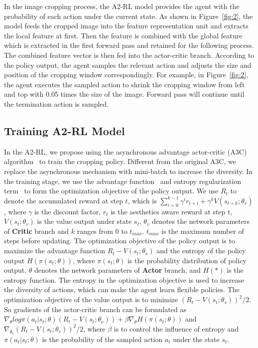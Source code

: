 \documentclass[10pt,twocolumn,letterpaper]{article}
\begin{document}
In the image cropping process, the A2-RL model provides the agent with the probability of each action under the current state. As shown in Figure~\ref{fig:2}, the model feeds the cropped image into the feature representation unit and extracts the local feature at first. Then the feature is combined with the global feature which is extracted in the first forward pass and retained for the following process. The combined feature vector is then fed into the actor-critic branch. According to the policy output, the agent samples the relevant action and adjusts the size and position of the cropping window correspondingly. For example, in Figure~\ref{fig:2}, the agent executes the sampled action to shrink the cropping window from left and top with 0.05 times the size of the image. Forward pass will continue until the termination action is sampled.
\subsection{Training A2-RL Model}
In the A2-RL, we propose using the asynchronous advantage actor-critic (A3C) algorithm~\cite{mnih2016asynchronous} to train the cropping policy.  Different from the original A3C, we replace the asynchronous mechanism with mini-batch to increase the diversity. In the training stage, we use the advantage function~\cite{mnih2016asynchronous} and entropy regularization term~\cite{williams1991function} to form the optimization objective of the policy output. We use $R_t$ to denote the accumulated reward at step $t$, which is $\sum_{i=0}^{k-1}\gamma^ir_{t+i} + \gamma^kV(s_{t+k};\theta_v)$, where $\gamma$ is the discount factor, $r_t$ is the aesthetics aware reward at step t, $V(s_t;\theta_v)$ is the value output under state $s_t$, $\theta_v$ denotes the network parameters of \textbf{Critic} branch and $k$ ranges from 0 to $t_{max}$. $t_{max}$ is the maximum number of steps before updating. The optimization objective of the policy output is to maximize the advantage function $R_t-V(s_t;\theta_v)$ and the entropy of the policy output $H(\pi(s_t;\theta))$, where $\pi(s_t;\theta)$ is the probability distribution of policy output, $\theta$ denotes the network parameters of \textbf{Actor} branch, and $H(*)$ is the entropy function. The entropy in the optimization objective is used to increase the diversity of actions, which can make the agent learn flexible policies. The optimization objective of the value output is to minimize $(R_t -V(s_t;\theta_v))^2/2$. So gradients of the actor-critic branch can be formulated as $\nabla_{\theta}log \pi(a_t|s_t;\theta)(R_t-V(s_t;\theta_v))+\beta\nabla_{\theta} H(\pi(s_t;\theta))$ and $\nabla_{\theta_v}(R_t - V(s_t;\theta_v))^2/2$, where $\beta$ is to control the influence of entropy and $\pi(a_t|s_t;\theta)$ is the probability of the sampled action $a_t$ under the state $s_t$.
\end{document}

